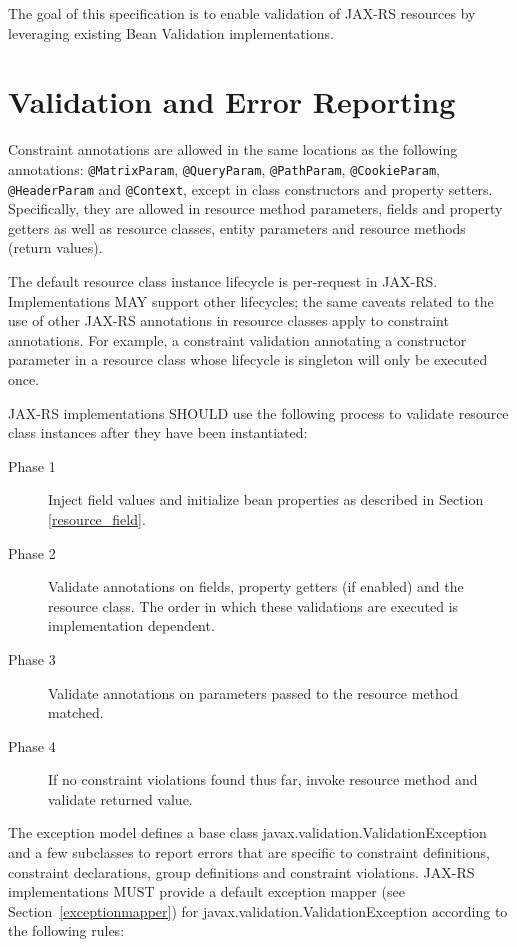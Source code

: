     The goal of this specification is to enable validation of JAX-RS resources by leveraging existing Bean Validation
    implementations.

    \section{Validation and Error Reporting}
    \label{validation_and_error_reporting}

    Constraint annotations are allowed in the same locations as the following annotations: \lstinline{@MatrixParam},
    \lstinline{@QueryParam}, \lstinline{@PathParam}, \lstinline{@CookieParam}, \lstinline{@HeaderParam} and
    \lstinline{@Context}, except in class constructors and property setters. Specifically, they are allowed in resource
    method parameters, fields and property getters as well as resource classes, entity parameters and resource methods
    (return values).

    The default resource class instance lifecycle is per-request in JAX-RS. Implementations MAY support other lifecycles;
    the same caveats related to the use of other JAX-RS annotations in resource classes apply to constraint annotations. For
    example, a constraint validation annotating a constructor parameter in a resource class whose lifecycle is singleton
    will only be executed once.

    JAX-RS implementations SHOULD use the following process to validate resource class instances after they have been
    instantiated:

\begin{description}
    \item[Phase 1] Inject field values and initialize bean properties as described in Section \ref{resource_field}.
    \item[Phase 2] Validate annotations on fields, property getters (if enabled) and the resource class. The order in
    which these validations are executed is implementation dependent.
    \item[Phase 3] Validate annotations on parameters passed to the resource method matched.
    \item[Phase 4] If no constraint violations found thus far, invoke resource method and validate returned value.
\end{description}

The exception model defines a base class javax.validation.ValidationException and a few subclasses to report errors that
are specific to constraint definitions, constraint declarations, group definitions and constraint  violations. JAX-RS
implementations MUST provide a default exception mapper (see Section~\ref{exceptionmapper}) for
javax.validation.ValidationException according to the following rules:

